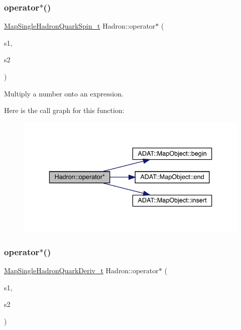 \subsubsection{\texorpdfstring{operator$\ast$()}{operator*()}\hspace{0.1cm}{\footnotesize\ttfamily [2/6]}}
{\footnotesize\ttfamily \mbox{\hyperlink{namespaceHadron_a22279e56b59508dc8dd2c8991dc911fd}{Map\+Single\+Hadron\+Quark\+Spin\+\_\+t}} Hadron\+::operator$\ast$ (\begin{DoxyParamCaption}\item[{const std\+::complex$<$ double $>$ \&}]{s1,  }\item[{const \mbox{\hyperlink{namespaceHadron_a22279e56b59508dc8dd2c8991dc911fd}{Map\+Single\+Hadron\+Quark\+Spin\+\_\+t}} \&}]{s2 }\end{DoxyParamCaption})}



Multiply a number onto an expression. 

Here is the call graph for this function\+:\nopagebreak
\begin{figure}[H]
\begin{center}
\leavevmode
\includegraphics[width=336pt]{d1/daf/namespaceHadron_ab9e06323f5f25fbcb53926b3898935a6_cgraph}
\end{center}
\end{figure}
\mbox{\label{namespaceHadron_a559c56047e1679b244bd6770b9f3c3b8}} 
\subsubsection{\texorpdfstring{operator$\ast$()}{operator*()}\hspace{0.1cm}{\footnotesize\ttfamily [3/6]}}
{\footnotesize\ttfamily \mbox{\hyperlink{namespaceHadron_aa588220689caea8a6aad4d0296526e6b}{Map\+Single\+Hadron\+Quark\+Deriv\+\_\+t}} Hadron\+::operator$\ast$ (\begin{DoxyParamCaption}\item[{double}]{s1,  }\item[{const \mbox{\hyperlink{namespaceHadron_aa588220689caea8a6aad4d0296526e6b}{Map\+Single\+Hadron\+Quark\+Deriv\+\_\+t}} \&}]{s2 }\end{DoxyParamCaption})}



